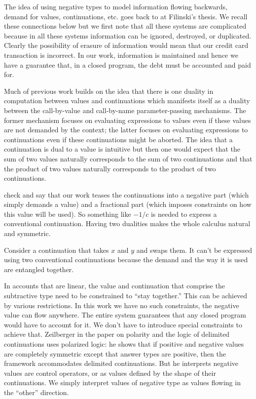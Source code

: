 \documentclass[preprint]{sigplanconf}
\begin{document}
{The idea of using negative types to model information flowing backwards,
demand for values, continuations, etc. goes back to at Filinski's thesis. We
recall these connections below but we first note that all these systems are
complicated because in all these systems information can be ignored,
destroyed, or duplicated. Clearly the possibility of erasure of information
would mean that our credit card transaction is incorrect. In our work,
information is maintained and hence we have a guarantee that, in a closed
program, the debt must be accounted and paid for.

Much of previous work builds on the idea that there is one duality in
computation between values and continuations which manifests itself as a
duality between the call-by-value and call-by-name parameter-passing
mechanisms. The former mechanism focuses on evaluating expressions to values
even if these values are not demanded by the context; the latter focuses on
evaluating expressions to continuations even if these continuations might be
aborted. The idea that a continuation is dual to a value is intuitive but
then one would expect that the sum of two values naturally corresponds to the
sum of two continuations and that the product of two values naturally
corresponds to the product of two continuations.

check and say that our work teases the continuations into a negative part
(which simply demands a value) and a fractional part (which imposes
constraints on how this value will be used). So something like $-1/c$ is
needed to express a conventional continuation. Having two dualities makes the
whole calculus natural and symmetric.

Consider a continuation that takes $x$ and $y$ and swaps them. It can't be
expressed using two conventional continuations because the demand and the way
it is used are entangled together.

In accounts that are linear, the value and continuation that comprise the
subtractive type need to be constrained to ``stay together.'' This can be
achieved by various restrictions. In this work we have no such constraints,
the negative value can flow anywhere. The entire system guarantees that any
closed program would have to account for it. We don't have to introduce
special constraints to achieve that. Zeilberger in the paper on polarity and
the logic of delimited continuations uses polarized logic: he shows that if
positive and negative values are completely symmetric except that answer
types are positive, then the framework accommodates delimited
continuations. But he interprets negative values are control operators, or as
values defined by the shape of their continuations. We simply interpret
values of negative type as values flowing in the ``other'' direction.

}
\end{document}
